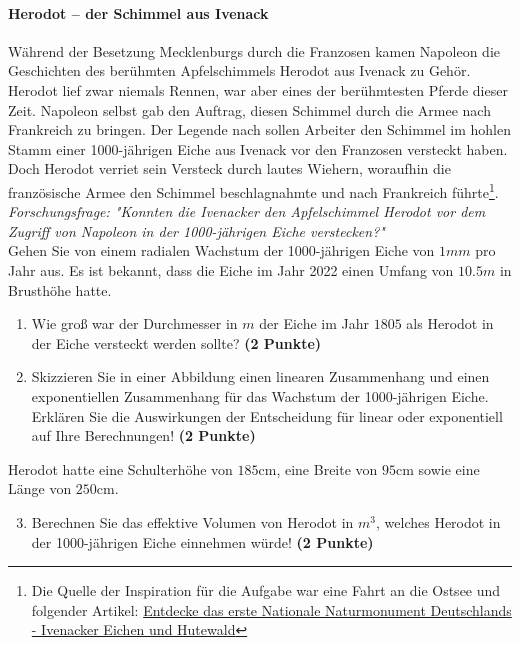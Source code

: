 \documentclass[a4paper, 9pt]{scrartcl}\usepackage[]{graphicx}\usepackage[]{xcolor}
\begin{document}
\paragraph{Herodot – der Schimmel aus Ivenack}

W{\"a}hrend der Besetzung Mecklenburgs durch die Franzosen kamen Napoleon die
Geschichten des ber{\"u}hmten Apfelschimmels Herodot aus Ivenack zu
Geh{\"o}r. Herodot lief zwar niemals Rennen, war aber eines der ber{\"u}hmtesten
Pferde dieser Zeit. Napoleon selbst gab den Auftrag, diesen
Schimmel durch die Armee nach Frankreich zu bringen. Der Legende nach
sollen Arbeiter den Schimmel im hohlen Stamm einer 1000-j{\"a}hrigen Eiche aus Ivenack vor
den Franzosen versteckt haben. Doch Herodot verriet sein Versteck durch
lautes Wiehern, woraufhin die franz{\"o}sische Armee den Schimmel
beschlagnahmte und nach Frankreich f{\"u}hrte\footnote{Die Quelle der Inspiration
  für die Aufgabe war eine Fahrt an die Ostsee und folgender Artikel:
  \href{https://www.wald-mv.de/landingpage/ivenacker-eichen/}{Entdecke das erste Nationale Naturmonument Deutschlands - Ivenacker Eichen und Hutewald}}. \\



\textit{Forschungsfrage: "Konnten die Ivenacker den Apfelschimmel Herodot
  vor dem Zugriff von Napoleon in der 1000-j{\"a}hrigen Eiche verstecken?"} \\

Gehen Sie von einem radialen Wachstum der 1000-j{\"a}hrigen Eiche von
$1mm$ pro Jahr aus. Es ist bekannt, dass die Eiche im
Jahr 2022 einen Umfang von $10.5m$ in Brusth{\"o}he hatte.

\begin{enumerate}
\item Wie gro{\ss} war der Durchmesser in $m$ der Eiche im Jahr $1805$ als
  Herodot in der Eiche versteckt werden sollte?
  \textbf{(2 Punkte)}
\item Skizzieren Sie in einer Abbildung einen linearen Zusammenhang und einen
exponentiellen Zusammenhang f{\"u}r das Wachstum der 1000-j{\"a}hrigen Eiche. Erkl{\"a}ren Sie die
Auswirkungen der Entscheidung f{\"u}r linear oder exponentiell auf Ihre
Berechnungen! \textbf{(2 Punkte)}
\end{enumerate}
 
Herodot hatte eine Schulterh{\"o}he von $185$cm, eine Breite von
$95$cm sowie eine L{\"a}nge von  $250$cm.

\begin{enumerate}
  \setcounter{enumi}{2}
\item Berechnen Sie das effektive Volumen von Herodot in $m^3$, welches
  Herodot in der 1000-j{\"a}hrigen Eiche einnehmen w{\"u}rde! \textbf{(2 Punkte)}
\end{enumerate}
\end{document}
